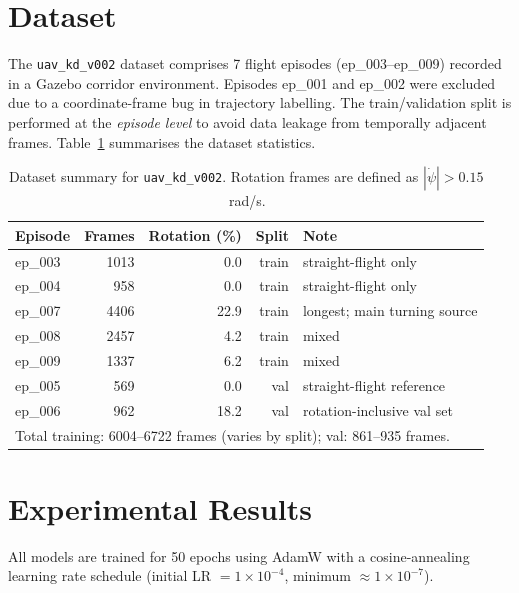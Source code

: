 \documentclass[12pt,a4paper]{article}
\begin{document}
\section{Dataset}

The \texttt{uav\_kd\_v002} dataset comprises 7 flight episodes
(ep\_003--ep\_009) recorded in a Gazebo corridor environment.
Episodes ep\_001 and ep\_002 were excluded due to a coordinate-frame bug in
trajectory labelling.
The train/validation split is performed at the \emph{episode level} to avoid
data leakage from temporally adjacent frames.
Table~\ref{tab:dataset} summarises the dataset statistics.

\begin{table}[H]
\centering
\caption{Dataset summary for \texttt{uav\_kd\_v002}.
Rotation frames are defined as $|\dot{\psi}|>0.15$\,rad/s.}
\label{tab:dataset}
\small
\begin{tabular}{lrrrl}
\toprule
Episode & Frames & Rotation (\%) & Split & Note \\
\midrule
ep\_003 & 1013 & 0.0  & train & straight-flight only \\
ep\_004 &  958 & 0.0  & train & straight-flight only \\
ep\_007 & 4406 & 22.9 & train & longest; main turning source \\
ep\_008 & 2457 & 4.2  & train & mixed \\
ep\_009 & 1337 & 6.2  & train & mixed \\
ep\_005 &  569 & 0.0  & val   & straight-flight reference \\
ep\_006 &  962 & 18.2 & val   & rotation-inclusive val set \\
\bottomrule
\multicolumn{5}{l}{\small Total training: 6004--6722 frames (varies by split); val: 861--935 frames.}
\end{tabular}
\end{table}

\section{Experimental Results}

All models are trained for 50 epochs using AdamW with a cosine-annealing
learning rate schedule (initial LR $= 1{\times}10^{-4}$, minimum $\approx 1{\times}10^{-7}$).
\end{document}
